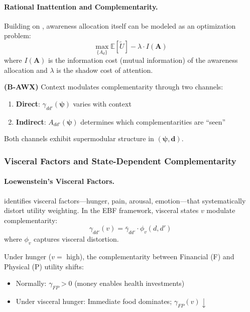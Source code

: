 \paragraph{Rational Inattention and Complementarity.}

Building on \citet{sims2003implications}, awareness allocation itself can be 
modeled as an optimization problem:
\begin{equation}
\max_{\{A_d\}} \mathbb{E}[\tilde{U}] - \lambda \cdot I(\mathbf{A})
\end{equation}
where $I(\mathbf{A})$ is the information cost (mutual information) of the 
awareness allocation and $\lambda$ is the shadow cost of attention.

\begin{axiom}
\label{ax:B-AWX}
\textbf{(B-AWX)} Context modulates complementarity through two channels:
\begin{enumerate}
    \item \textbf{Direct}: $\gamma_{dd'}(\boldsymbol{\psi})$ varies with context
    \item \textbf{Indirect}: $A_{dd'}(\boldsymbol{\psi})$ determines which 
    complementarities are ``seen''
\end{enumerate}
Both channels exhibit supermodular structure in $(\boldsymbol{\psi}, \mathbf{d})$.
\end{axiom}

\subsubsection{Visceral Factors and State-Dependent Complementarity}

\paragraph{Loewenstein's Visceral Factors.}

\citet{loewenstein1996out} identifies visceral factors---hunger, pain, arousal, 
emotion---that systematically distort utility weighting. In the EBF framework, 
visceral states $v$ modulate complementarity:
\begin{equation}
\gamma_{dd'}(v) = \bar{\gamma}_{dd'} \cdot \phi_v(d, d')
\end{equation}
where $\phi_v$ captures visceral distortion.

\begin{example}
Under hunger ($v = $ high), the complementarity between Financial (F) and Physical (P) 
utility shifts:
\begin{itemize}
    \item Normally: $\gamma_{FP} > 0$ (money enables health investments)
    \item Under visceral hunger: Immediate food dominates; $\gamma_{FP}(v) \downarrow$
\end{itemize}
\end{example}

